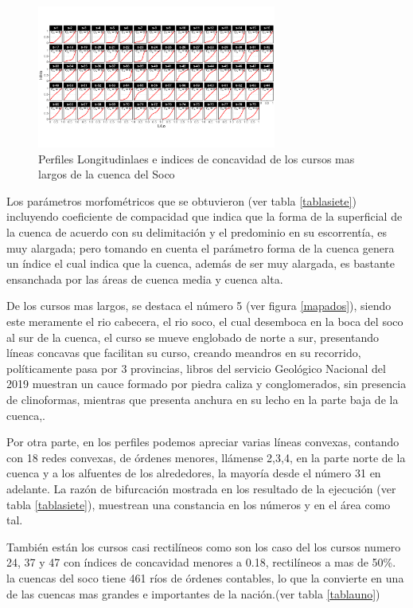 \documentclass[11pt,]{article}
\begin{document}
\begin{figure}
\centering
\includegraphics[width=0.70000\textwidth]{mas largos.png}
\caption{Perfiles Longitudinlaes e indices de concavidad de los cursos
mas largos de la cuenca del Soco\label{mapaocho}}
\end{figure}

Los parámetros morfométricos que se obtuvieron (ver tabla
\ref{tablasiete}) incluyendo coeficiente de compacidad que indica que la
forma de la superficial de la cuenca de acuerdo con su delimitación y el
predominio en su escorrentía, es muy alargada; pero tomando en cuenta el
parámetro forma de la cuenca genera un índice el cual indica que la
cuenca, además de ser muy alargada, es bastante ensanchada por las áreas
de cuenca media y cuenca alta.

De los cursos mas largos, se destaca el número 5 (ver figura
\ref{mapados}), siendo este meramente el rio cabecera, el rio soco, el
cual desemboca en la boca del soco al sur de la cuenca, el curso se
mueve englobado de norte a sur, presentando líneas concavas que
facilitan su curso, creando meandros en su recorrido, políticamente pasa
por 3 provincias, libros del servicio Geológico Nacional del 2019
muestran un cauce formado por piedra caliza y conglomerados, sin
presencia de clinoformas, mientras que presenta anchura en su lecho en
la parte baja de la cuenca,.

Por otra parte, en los perfiles podemos apreciar varias líneas convexas,
contando con 18 redes convexas, de órdenes menores, llámense 2,3,4, en
la parte norte de la cuenca y a los alfuentes de los alrededores, la
mayoría desde el número 31 en adelante. La razón de bifurcación mostrada
en los resultado de la ejecución (ver tabla \ref{tablasiete}), muestrean
una constancia en los números y en el área como tal.

También están los cursos casi rectilíneos como son los caso del los
cursos numero 24, 37 y 47 con índices de concavidad menores a 0.18,
rectilíneos a mas de 50\%. la cuencas del soco tiene 461 ríos de órdenes
contables, lo que la convierte en una de las cuencas mas grandes e
importantes de la nación.(ver tabla \ref{tablauno})
\end{document}
